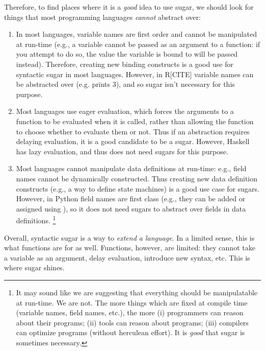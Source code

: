 Therefore, to find places where it is a \emph{good} idea to use sugar,
we should look for things that most programming languages
\emph{cannot} abstract over:
\begin{enumerate}
  \item In most languages, variable names are first order and cannot
    be manipulated at run-time (e.g., a variable cannot be passed as
    an argument to a function: if you attempt to do so, the value the
    variable is bound to will be passed instead). Therefore, creating
    new binding constructs is a good use for syntactic sugar in most
    languages. However, in R[CITE] variable names can be abstracted
    over (e.g.  prints 3), and so sugar isn't
    necessary for this purpose.
  \item Most languages use eager evaluation,
    which forces the arguments to a function to be
    evaluated when it is called, rather than allowing the function to
    choose whether to
    evaluate them or not. Thus if an abstraction requires delaying
    evaluation, it is a good candidate to be a sugar. However, Haskell
    has lazy evaluation, and thus does not need sugars for this purpose.
  \item Most languages cannot manipulate data definitions at run-time:
    e.g., field names cannot be dynamically constructed. Thus creating
    new data definition constructs (e.g., a way to define state
    machines) is a good use case for sugars. However, in Python field
    names are first class (e.g., they can be added or assigned using
    ), so it does not need sugars to abstract over fields
    in data definitions.%
    \footnote{
    It may sound like we are suggesting that everything should be
    manipulatable at run-time. We are not. The more
    things which are fixed at compile time (variable names, field
    names, etc.), the more (i) programmers can reason about their
    programs; (ii) tools can reason about programs; (iii) compilers
    can optimize programs (without herculean effort). It is
    \emph{good} that sugar is sometimes necessary.
  }
\end{enumerate}

Overall, syntactic sugar is a way to \emph{extend a language}.
In a limited sense, this is what functions are for as well.
Functions, however, are limited: they cannot take a variable as an
argument, delay evaluation, introduce new syntax, etc. This is where
sugar shines.


